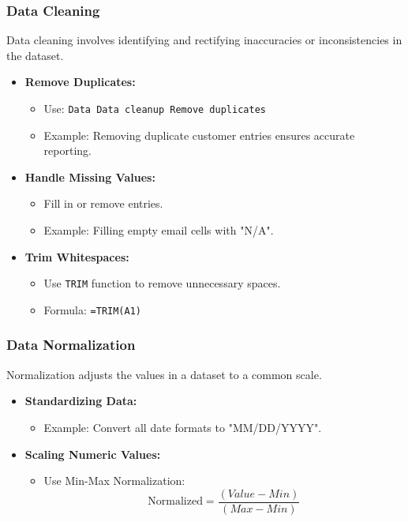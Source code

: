 \documentclass[aspectratio=169]{beamer}
\begin{document}
\begin{frame}[fragile]
    \frametitle{Data Cleaning}
    Data cleaning involves identifying and rectifying inaccuracies or inconsistencies in the dataset.

    \begin{itemize}
        \item \textbf{Remove Duplicates:}
            \begin{itemize}
                \item Use: \texttt{Data \textrightarrow Data cleanup \textrightarrow Remove duplicates}
                \item Example: Removing duplicate customer entries ensures accurate reporting.
            \end{itemize}

        \item \textbf{Handle Missing Values:}
            \begin{itemize}
                \item Fill in or remove entries.
                \item Example: Filling empty email cells with "N/A".
            \end{itemize}

        \item \textbf{Trim Whitespaces:}
            \begin{itemize}
                \item Use \texttt{TRIM} function to remove unnecessary spaces.
                \item Formula: \texttt{=TRIM(A1)}
            \end{itemize}
    \end{itemize}
\end{frame}

\begin{frame}[fragile]
    \frametitle{Data Normalization}
    Normalization adjusts the values in a dataset to a common scale.

    \begin{itemize}
        \item \textbf{Standardizing Data:}
            \begin{itemize}
                \item Example: Convert all date formats to "MM/DD/YYYY".
            \end{itemize}

        \item \textbf{Scaling Numeric Values:}
            \begin{itemize}
                \item Use Min-Max Normalization:
                \begin{equation}
                    \text{Normalized} = \frac{(Value - Min)}{(Max - Min)}
                \end{equation}
            \end{itemize}
    \end{itemize}
\end{frame}
\end{document}

